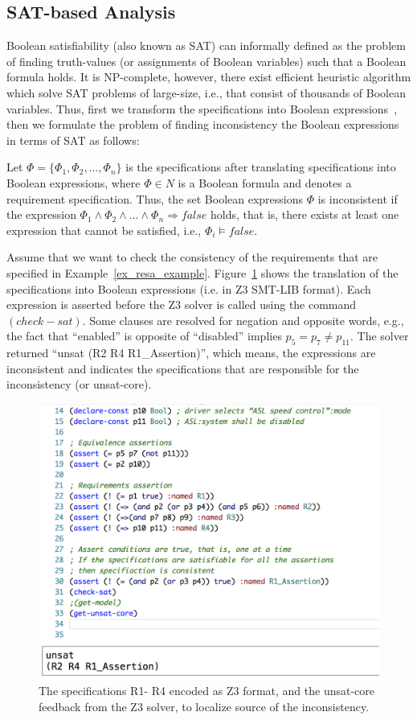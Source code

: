 \subsection*{SAT-based Analysis}
Boolean satisfiability (also known as SAT) can informally defined as the problem of finding truth-values (or assignments of Boolean variables) such that a Boolean formula holds. It is NP-complete, however, there exist efficient heuristic algorithm which solve SAT problems of large-size, i.e., that consist of thousands of Boolean variables. Thus, first we transform the \resa{} specifications into Boolean expressions~\cite{resatool}, then we formulate the problem of finding inconsistency the Boolean expressions in terms of SAT as follows:
\begin{definition}
	Let $\Phi = \{\Phi_1, \Phi_2,\dots,\Phi_n\}$ is the \resa{} specifications after translating \resa{} specifications into Boolean expressions, where  $\Phi\in N$ is a Boolean formula and denotes a requirement specification. Thus, the set Boolean expressions $\Phi$ is inconsistent if the expression $\Phi_1 \land \Phi_2 \land\dots\land \Phi_n \Rightarrow false$ holds, that is, there exists at least one expression that cannot be satisfied, i.e., $\Phi_i\models false$.
\end{definition}
\begin{example}
Assume that we want to check the consistency of the requirements that are specified in Example~\ref{ex_resa_example}. Figure~\ref{fig_z3} shows the translation of the specifications into Boolean expressions (i.e. in Z3  SMT-LIB format). Each expression is asserted before the Z3 solver is called using the command $(check-sat)$. Some clauses are resolved for negation and opposite words, e.g., the fact that ``enabled'' is opposite of ``disabled'' implies $p_5=p_7\neq p_{11}$. The solver returned ``unsat (R2 R4 R1\_Assertion)'',  which means, the expressions are inconsistent and indicates the specifications that are responsible for the inconsistency (or unsat-core).
\end{example}
\begin{figure}[h]
	\centering
	\includegraphics[width=0.7\linewidth]{images/z3}
	\caption{The \resa{} specifications R1- R4 encoded as Z3 format, and the unsat-core feedback from the Z3 solver, to localize source of the inconsistency.}
	\label{fig_z3}
\end{figure}

